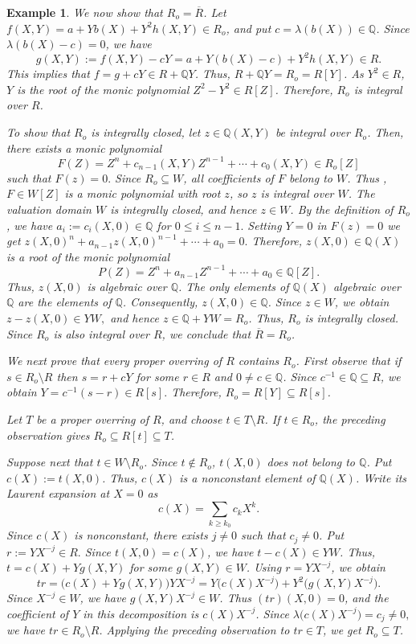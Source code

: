 \documentclass[12pt]{article}
\newtheorem{example}{Example}
\begin{document}
\begin{example}
	\smallskip
	We now show that $R_o=\overline R$.
	Let $f(X,Y)=a+Yb(X)+Y^2h(X,Y)\in R_o$, and put
	$c=\lambda(b(X))\in\mathbb Q$.
	Since $\lambda(b(X)-c)=0$, we have
	\[
	g(X,Y):=f(X,Y)-cY=a+Y(b(X)-c)+Y^2h(X,Y)\in R.
	\]
	This implies that $f=g+cY\in R+\mathbb{Q}Y$. Thus, $R+\mathbb QY=R_o=R[Y]$. As $Y^2\in R$, $Y $ is the root of the monic polynomial $Z^2-Y^2\in R[Z]$. Therefore, $R_o$ is integral over $R$.
	
	\smallskip To show that $R_o$ is integrally closed, let $z\in\mathbb Q(X,Y)$ be integral over $R_o$. Then, there exists a monic polynomial 
	\[F(Z)=Z^n+c_{n-1}(X,Y)Z^{n-1}+\cdots+c_0(X,Y)\in R_o[Z]\] 
	such that $F(z)=0.$	Since $R_o\subseteq W$, all coefficients of $F$	belong to $W$. Thus ,$F\in W[Z]$ is a monic polynomial with root $z$, so $z$ is integral over $W$. The valuation domain $W$ is integrally closed, and hence $z\in W$. By the definition of $R_o$, we have $a_i:= c_i(X,0)\in\mathbb Q$ for $0\leq i\leq n-1.$ Setting $Y=0$ in $F(z)=0$ we get $z(X,0)^n+ a_{n-1}z(X,0)^{n-1}+\cdots+a_0=0.$ Therefore, $z(X,0)\in\mathbb Q(X)$ is a root of the monic polynomial
	\[ P(Z)=Z^n+a_{n-1}Z^{n-1}+\cdots+a_0 \in\mathbb Q[Z]. \]
	Thus, $z(X,0)$ is algebraic over $\mathbb Q$. The only elements of $\mathbb Q(X)$ algebraic over $\mathbb Q$ are the elements of $\mathbb Q$. Consequently, $z(X,0)\in\mathbb Q$. Since $z\in W$, we obtain $z-z(X,0)\in YW,$ and hence $z\in\mathbb Q+YW=R_o$. Thus, $R_o$ is integrally closed. Since $R_o$ is also integral over $R$, we conclude that $\overline R=R_o$.
	
	We next prove that every proper overring of $R$ contains $R_o$. First observe that if $s\in R_o\setminus R$ then  $s=r+cY$ for some $r\in R$ and $0\neq c\in\mathbb Q$. Since $c^{-1}\in\mathbb Q\subseteq R$, we obtain $Y=c^{-1}(s-r)\in R[s].$ Therefore, $R_o=R[Y] \subseteq R[s]$.
	
	Let $T$ be a proper overring of $R$, and choose $t\in T\setminus R$. If $t\in R_o$, the preceding observation gives $R_o\subseteq R[t]\subseteq T$.
	
	Suppose next that $t\in W\setminus R_o$. Since $t\notin R_o$, $t(X,0)$ does not belong to $\mathbb Q$. Put $c(X):=t(X,0)$. Thus, $c(X)$ is a nonconstant element of $\mathbb Q(X)$. Write its Laurent expansion at $X=0$ as $$c(X)=\sum_{k\geq k_0}c_kX^k.$$ Since $c(X)$ is nonconstant, there exists $j\neq0$ such that $c_j\neq0$. Put $r:=YX^{-j}\in R.$ Since $t(X,0)=c(X)$, we have $t-c(X)\in YW$. Thus, $t=c(X)+Yg(X,Y)$ for some $g(X,Y)\in W$. Using $r=YX^{-j}$, we obtain \[tr=\bigl(c(X)+Yg(X,Y)\bigr)YX^{-j}=Y\bigl(c(X)X^{-j}\bigr)+Y^2\bigl(g(X,Y)X^{-j}\bigr).\]
	Since $X^{-j}\in W$, we have $g(X,Y)X^{-j}\in W$. Thus $(tr)(X,0)=0$, and the coefficient of $Y$ in this decomposition is $c(X)X^{-j}$. Since $\lambda\bigl(c(X)X^{-j}\bigr)=c_j\neq0,$ we have $tr\in R_o\setminus R$. Applying the preceding observation to $tr\in T$, we get $R_o\subseteq T$.
	

\end{example}
\end{document}
